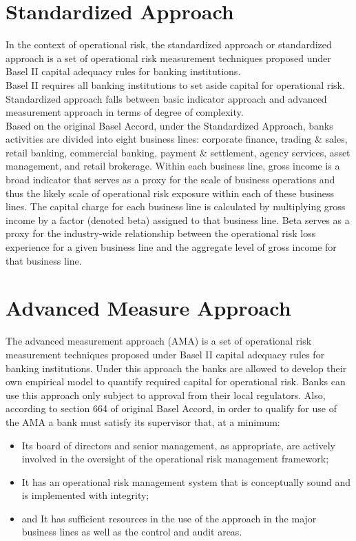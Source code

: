 \documentclass[12pt, a4paper]{report}
\begin{document}
\section{Standardized Approach}
In the context of operational risk, the standardized approach or
standardized approach is a set of operational risk measurement
techniques proposed under Basel II capital adequacy rules for
banking institutions. \\Basel II requires all banking institutions
to set aside capital for operational risk. Standardized approach
falls between basic indicator approach and advanced measurement
approach in terms of degree of complexity. \\Based on the original
Basel Accord, under the Standardized Approach, banks activities
are divided into eight business lines: corporate finance, trading
\& sales, retail banking, commercial banking, payment \&
settlement, agency services, asset management, and retail
brokerage. Within each business line, gross income is a broad
indicator that serves as a proxy for the scale of business
operations and thus the likely scale of operational risk exposure
within each of these business lines. The capital charge for each
business line is calculated by multiplying gross income by a
factor (denoted beta) assigned to that business line. Beta serves
as a proxy for the industry-wide relationship between the
operational risk loss experience for a given business line and the
aggregate level of gross income for that business line.


\section{Advanced Measure Approach}
The advanced measurement approach (AMA) is a set of operational
risk measurement techniques proposed under Basel II capital
adequacy rules for banking institutions. Under this approach the
banks are allowed to develop their own empirical model to quantify
required capital for operational risk. Banks can use this approach
only subject to approval from their local regulators. Also,
according to section 664 of original Basel Accord, in order to
qualify for use of the AMA a bank must satisfy its supervisor
that, at a minimum:
\begin{itemize} \item Its board of directors
and senior management, as appropriate, are actively involved in
the oversight of the operational risk management framework; \item
It has an operational risk management system that is conceptually
sound and is implemented with integrity; \item and It has
sufficient resources in the use of the approach in the major
business lines as well as the control and audit areas.
\end{itemize}
\end{document}
